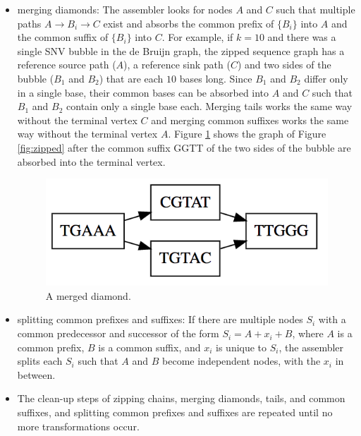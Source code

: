 \documentclass[nofootinbib,amssymb,amsmath]{revtex4}
\begin{document}
\begin{itemize}
\item merging diamonds: The assembler looks for nodes $A$ and $C$ such that multiple paths $A \rightarrow B_i \rightarrow C$ exist and absorbs the common prefix of $\{B_i\}$ into $A$ and the common suffix of $\{ B_i \}$ into $C$.  For example, if $k = 10$ and there was a single SNV bubble in the de Bruijn graph, the zipped sequence graph has a reference source path  ($A$), a reference sink path ($C$) and two sides of the bubble ($B_1$ and $B_2$) that are each $10$ bases long.  Since $B_1$ and $B_2$ differ only in a single base, their common bases can be absorbed into $A$ and $C$ such that $B_1$ and $B_2$ contain only a single base each.  Merging tails works the same way without the terminal vertex $C$ and merging common suffixes works the same way without the terminal vertex $A$.  Figure \ref{fig:diamond} shows the graph of Figure \ref{fig:zipped} after the common suffix GGTT of the two sides of the bubble are absorbed into the terminal vertex.

\begin{figure}
\center
\includegraphics[scale=0.5]{diamond.png}
\caption{A merged diamond.}
\label{fig:diamond}
\end{figure}

\item splitting common prefixes and suffixes: If there are multiple nodes $S_i$ with a common predecessor and successor of the form $S_i = A + x_i + B$, where $A$ is a common prefix, $B$ is a common suffix, and $x_i$ is unique to $S_i$, the assembler splits each $S_i$ such that $A$ and $B$ become independent nodes, with the $x_i$ in between.

\item The clean-up steps of zipping chains, merging diamonds, tails, and common suffixes, and splitting common prefixes and suffixes are repeated until no more transformations occur.

\end{itemize}
\end{document}
